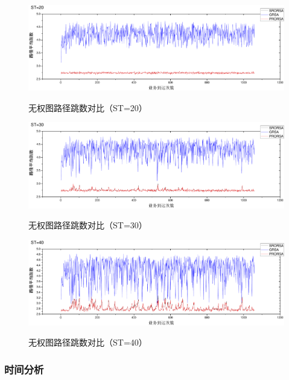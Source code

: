 \begin{figure}
\setlength{\belowcaptionskip}{-0.5cm}
\begin{center}
{\includegraphics[width=1 \textwidth]{figures/B20H.pdf}}
\end{center}
\caption{{\footnotesize{无权图路径跳数对比（ST=20）}}}
\label{B20H}
\end{figure}
\begin{figure}
\setlength{\belowcaptionskip}{-0.5cm}
\begin{center}
{\includegraphics[width=1 \textwidth]{figures/B30H.pdf}}
\end{center}
\caption{{\footnotesize{无权图路径跳数对比（ST=30）}}}
\label{B30H}
\end{figure}
\begin{figure}
\setlength{\belowcaptionskip}{-0.5cm}
\begin{center}
{\includegraphics[width=1 \textwidth]{figures/B40H.pdf}}
\end{center}
\caption{{\footnotesize{无权图路径跳数对比（ST=40）}}}
\label{B40H}
\end{figure}
\subsubsection{时间分析}

